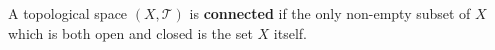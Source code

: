 A topological space $(X, \mathcal{T})$ is \textbf{connected} if the only non-empty subset of $X$ which is both open and closed is the set $X$ itself.
